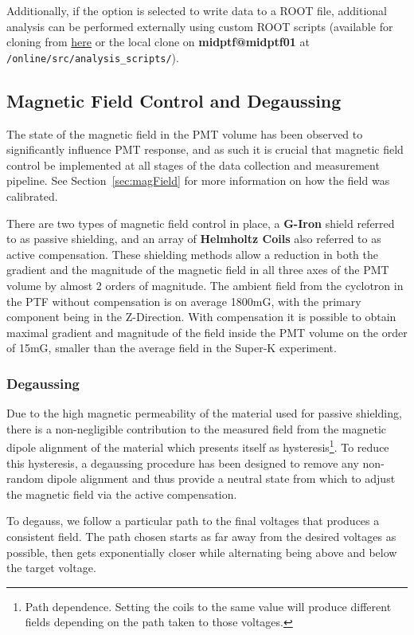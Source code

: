 \documentclass[twoside,letterpaper]{refart}
\begin{document}
Additionally, if the option is selected to write data to a ROOT file, additional analysis can be performed externally using custom ROOT scripts (available for cloning from \href{https://bitbucket.org/ttriumfdaq/ptf-analysis}{here} or the local clone on \textbf{midptf@midptf01} at \texttt{/online/src/analysis\_scripts/}).

\subsection{Magnetic Field Control and Degaussing}

The state of the magnetic field in the PMT volume has been observed to significantly influence PMT response, and as such it is crucial that magnetic field control be implemented at all stages of the data collection and measurement pipeline. See Section~\ref{sec:magField} for more information on how the field was calibrated.

There are two types of magnetic field control in place, a \textbf{G-Iron} shield referred to as passive shielding, and an array of \textbf{Helmholtz Coils} also referred to as active compensation. These shielding methods allow a reduction in both the gradient and the magnitude of the magnetic field in all three axes of the PMT volume by almost 2 orders of magnitude. The ambient field from the cyclotron in the PTF without compensation is on average 1800mG, with the primary component being in the Z-Direction. With compensation it is possible to obtain maximal gradient and magnitude of the field inside the PMT volume on the order of 15mG, smaller than the average field in the Super-K experiment.

\subsubsection{Degaussing}

Due to the high magnetic permeability of the material used for passive shielding, there is a non-negligible contribution to the measured field from the magnetic dipole alignment of the material which presents itself as hysteresis\footnote{Path dependence. Setting the coils to the same value will produce different fields depending on the path taken to those voltages.}. To reduce this hysteresis, a degaussing procedure has been designed to remove any non-random dipole alignment and thus provide a neutral state from which to adjust the magnetic field via the active compensation.

To degauss, we follow a particular path to the final voltages that produces a consistent field. The path chosen starts as far away from the desired voltages as possible, then gets exponentially closer while alternating being above and below the target voltage.
\end{document}
